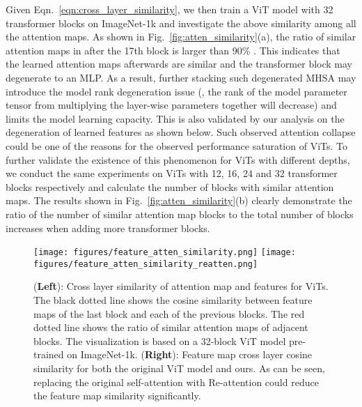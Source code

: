 \documentclass[10pt,twocolumn,letterpaper]{article}
\newcommand{\nameofatten}{Re-attention}
\begin{document}
Given Eqn.~\eqref{eqn:cross_layer_similarity}, we then train a ViT model with 32 transformer blocks on ImageNet-1k and  investigate the above similarity  among all the attention maps. As shown in Fig.~\ref{fig:atten_similarity}(a), the ratio of similar attention maps in   after the 17th block is larger than 90\% .
This indicates that the learned attention maps afterwards are similar and the transformer block may degenerate to an MLP. As a result, further stacking such degenerated MHSA
may introduce the model rank degeneration issue (\ie, the rank of  the model parameter tensor  from multiplying the layer-wise parameters together will decrease) and limits the model learning capacity. This is also validated by our analysis on the degeneration of  learned features as shown below.
Such observed attention collapse could be one of the reasons for the observed performance saturation of ViTs. 
To further validate the existence of  this phenomenon for ViTs with different depths, we  conduct the same experiments on ViTs with 12, 16, 24 and 32 transformer blocks respectively and calculate the number of blocks with similar attention maps. The results  shown in Fig.~\ref{fig:atten_similarity}(b) clearly demonstrate the  ratio of the number of similar attention map blocks to the total number of blocks increases when adding more transformer blocks. 

\begin{figure}[t] 
\small
\begin{center}
\texttt{[image: figures/feature\_atten\_similarity.png]}
\texttt{[image: figures/feature\_atten\_similarity\_reatten.png]}
\end{center}
\vspace{-15pt}
  \caption{
  (\textbf{Left}): Cross layer similarity of attention map and features for ViTs. The black dotted line shows the cosine similarity between feature maps of the last block and each of the previous blocks. The red dotted line shows the ratio of similar attention maps of adjacent blocks. The visualization is based on a 32-block ViT model   pre-trained on ImageNet-1k. (\textbf{Right}): Feature map cross layer cosine similarity for both the original ViT model and ours. As can be seen, replacing
  the original self-attention with \nameofatten{} could reduce the feature map similarity significantly. }
\label{fig:feature_similarity}
\end{figure}
\end{document}
